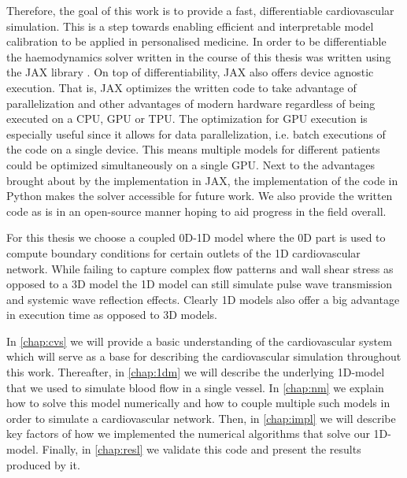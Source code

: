 \documentclass[a4paper, oneside]{discothesis}
\begin{document}
Therefore, the goal of this work is to provide a fast, differentiable cardiovascular simulation.
This is a step towards enabling efficient and interpretable model calibration to be applied in personalised medicine.
In order to be differentiable the haemodynamics solver written in the course of this thesis was written using the JAX library \cite{jax}.
On top of differentiability, JAX also offers device agnostic execution.
That is, JAX optimizes the written code to take advantage of parallelization and other advantages of modern hardware regardless of being executed on a CPU, GPU or TPU.
The optimization for GPU execution is especially useful since it allows for data parallelization, i.e. batch executions of the code on a single device.
This means multiple models for different patients could be optimized simultaneously on a single GPU.
Next to the advantages brought about by the implementation in JAX, the implementation of the code in Python makes the solver accessible for future work.
We also provide the written code as is in an open-source manner hoping to aid progress in the field overall.

For this thesis we choose a coupled 0D-1D model where the 0D part is used to compute boundary conditions for certain outlets of the 1D cardiovascular network.
While failing to capture complex flow patterns and wall shear stress as opposed to a 3D model the 1D model can still simulate pulse wave transmission and systemic wave reflection effects.
Clearly 1D models also offer a big advantage in execution time as opposed to 3D models. \cite{shi2011review,pfaller2020using,arzani2022machine} 

In \autoref{chap:cvs} we will provide a basic understanding of the cardiovascular system which will serve as a base for describing the cardiovascular simulation throughout this work.
Thereafter, in \autoref{chap:1dm} we will describe the underlying 1D-model that we used to simulate blood flow in a single vessel.
In \autoref{chap:nm} we explain how to solve this model numerically and how to couple multiple such models in order to simulate a cardiovascular network.
Then, in \autoref{chap:impl}  we will describe key factors of how we implemented the numerical algorithms that solve our 1D-model.
Finally, in \autoref{chap:resl} we validate this code and present the results produced by it.



\end{document}
